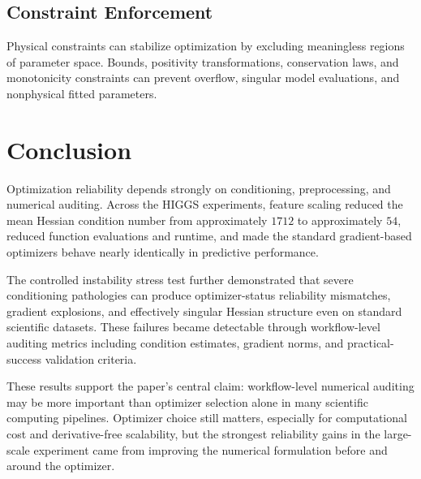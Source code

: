 \subsection{Constraint Enforcement}

Physical constraints can stabilize optimization by excluding meaningless regions of parameter space. Bounds, positivity transformations, conservation laws, and monotonicity constraints can prevent overflow, singular model evaluations, and nonphysical fitted parameters.


\section{Conclusion}

Optimization reliability depends strongly on conditioning, preprocessing, and numerical auditing. Across the HIGGS experiments, feature scaling reduced the mean Hessian condition number from approximately $1712$ to approximately $54$, reduced function evaluations and runtime, and made the standard gradient-based optimizers behave nearly identically in predictive performance.

The controlled instability stress test further demonstrated that severe conditioning pathologies can produce optimizer-status reliability mismatches, gradient explosions, and effectively singular Hessian structure even on standard scientific datasets. These failures became detectable through workflow-level auditing metrics including condition estimates, gradient norms, and practical-success validation criteria.

These results support the paper's central claim: workflow-level numerical auditing may be more important than optimizer selection alone in many scientific computing pipelines. Optimizer choice still matters, especially for computational cost and derivative-free scalability, but the strongest reliability gains in the large-scale experiment came from improving the numerical formulation before and around the optimizer.
